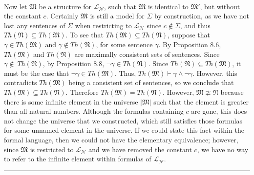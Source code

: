 \documentclass[11pt]{hmcpset}
\newenvironment{problem2}[1]{\noindent {\bf (#1}}
{\medskip}
\newenvironment{proof}{\noindent {\bf Proof:} \\}{\hfill
\rule{1mm}{3mm} \bigskip}
\begin{document}
\begin{problem2}{b)}
\begin{proof}
Now let $\mathfrak{M}$ be a structure for $\mathcal{L_N}$, such that $\mathfrak{M}$ is identical to $\mathfrak{M'}$, but without the constant $c$. Certainly $\mathfrak{M}$ is still a model for $\Sigma$ by construction, as we have not lost any sentences of $\Sigma$ when restricting to $\mathcal{L_N}$ since $c\notin \Sigma$, and thus $Th(\mathfrak{N})\subseteq Th(\mathfrak{M})$. To see that $Th(\mathfrak{M})\subseteq Th(\mathfrak{N})$, suppose that $\gamma\in Th(\mathfrak{M})$ and $\gamma\notin Th(\mathfrak{N})$, for some sentence $\gamma$. By Proposition 8.6, $Th(\mathfrak{M})$ and $Th(\mathfrak{N})$ are maximally consistent sets of sentences. Since $\gamma\notin\ Th(\mathfrak{N})$, by Proposition 8.8, $\neg\gamma\in Th(\mathfrak{N})$. Since $Th(\mathfrak{N})\subseteq Th(\mathfrak{M})$, it must be the case that $\neg\gamma\in Th(\mathfrak{M})$. Thus, $Th(\mathfrak{M})\vdash\gamma\land\neg\gamma.$ However, this contradicts $Th(\mathfrak{M})$ being a consistent set of sentences, so we conclude that $Th(\mathfrak{M})\subseteq Th(\mathfrak{N})$. Therefore $Th(\mathfrak{M})=Th(\mathfrak{N})$. However,  $\mathfrak{M}\ncong\mathfrak{N}$ because there is some infinite element in the universe $|\mathfrak{M}|$ such that the element is greater than all natural numbers. Although the formulas containing $c$ are gone, this does not change the universe that we constructed, which still satisfies those formulas for some unnamed element in the universe. If we could state this fact within the formal language, then we could not have the elementary equivalence; however, since $\mathfrak{M}$ is restricted to $\mathcal{L_N}$ and we have removed the constant $c$, we have no way to refer to the infinite element within formulas of $\mathcal{L_N}$.
\end{proof}

\end{problem2}
\end{document}
